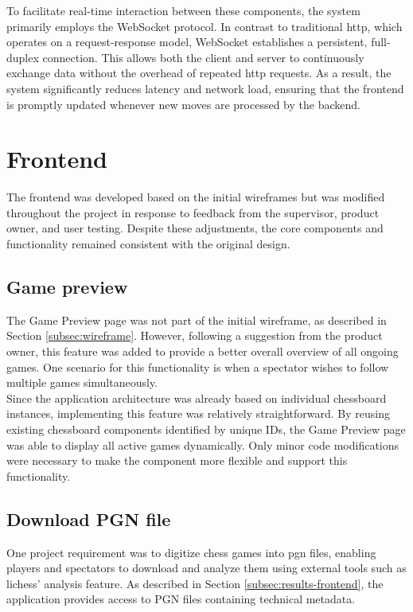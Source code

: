 To facilitate real-time interaction between these components, the system primarily employs the WebSocket protocol. In contrast to traditional \gls{http}, which operates on a request-response model, WebSocket establishes a persistent, full-duplex connection. This allows both the client and server to continuously exchange data without the overhead of repeated \gls{http} requests. As a result, the system significantly reduces latency and network load, ensuring that the frontend is promptly updated whenever new moves are processed by the backend.

\section{Frontend}
The frontend was developed based on the initial wireframes but was modified throughout the project in response to feedback from the supervisor, product owner, and user testing. Despite these adjustments, the core components and functionality remained consistent with the original design.

\subsection{Game preview}
The Game Preview page was not part of the initial wireframe, as described in Section \ref{subsec:wireframe}. However, following a suggestion from the product owner, this feature was added to provide a better overall overview of all ongoing games. One scenario for this functionality is when a spectator wishes to follow multiple games simultaneously. \\

Since the application architecture was already based on individual chessboard instances, implementing this feature was relatively straightforward. By reusing existing chessboard components identified by unique IDs, the Game Preview page was able to display all active games dynamically. Only minor code modifications were necessary to make the component more flexible and support this functionality.

\subsection{Download PGN file}
One project requirement was to digitize chess games into \gls{pgn} files, enabling players and spectators to download and analyze them using external tools such as lichess’ analysis feature. As described in Section \ref{subsec:results-frontend}, the application provides access to PGN files containing technical metadata. \\

